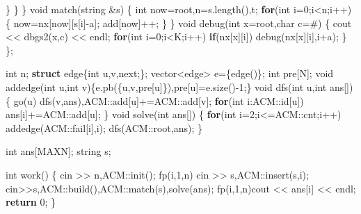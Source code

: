 \documentclass[
]{article}
\newenvironment{Shaded}{}{}
\newcommand{\CharTok}[1]{\textcolor[rgb]{0.25,0.44,0.63}{#1}}
\newcommand{\ControlFlowTok}[1]{\textcolor[rgb]{0.00,0.44,0.13}{\textbf{#1}}}
\newcommand{\DataTypeTok}[1]{\textcolor[rgb]{0.56,0.13,0.00}{#1}}
\newcommand{\DecValTok}[1]{\textcolor[rgb]{0.25,0.63,0.44}{#1}}
\newcommand{\KeywordTok}[1]{\textcolor[rgb]{0.00,0.44,0.13}{\textbf{#1}}}
\newcommand{\NormalTok}[1]{#1}
\begin{document}
\begin{Shaded}
\begin{Highlighting}[]
\NormalTok{            \}}
\NormalTok{        \}}
\NormalTok{    \}}
    \DataTypeTok{void}\NormalTok{ match(string \&s)}
\NormalTok{    \{}
        \DataTypeTok{int}\NormalTok{ now=root,n=s.length(),t;}
        \ControlFlowTok{for}\NormalTok{(}\DataTypeTok{int}\NormalTok{ i=}\DecValTok{0}\NormalTok{;i\textless{}n;i++)}
\NormalTok{        \{}
\NormalTok{            now=nx[now][s[i]{-}}\CharTok{\textquotesingle{}a\textquotesingle{}}\NormalTok{];}
\NormalTok{            add[now]++;}
\NormalTok{        \}}
\NormalTok{    \}}
    \DataTypeTok{void}\NormalTok{ debug(}\DataTypeTok{int}\NormalTok{ x=root,}\DataTypeTok{char}\NormalTok{ c=}\CharTok{\textquotesingle{}\#\textquotesingle{}}\NormalTok{)}
\NormalTok{    \{}
\NormalTok{        cout \textless{}\textless{} dbgs2(x,c) \textless{}\textless{} endl;}
        \ControlFlowTok{for}\NormalTok{(}\DataTypeTok{int}\NormalTok{ i=}\DecValTok{0}\NormalTok{;i\textless{}K;i++)}
            \ControlFlowTok{if}\NormalTok{(nx[x][i])}
\NormalTok{                debug(nx[x][i],i+}\CharTok{\textquotesingle{}a\textquotesingle{}}\NormalTok{);}
\NormalTok{    \}}
\NormalTok{\};}

\DataTypeTok{int}\NormalTok{ n;}
\KeywordTok{struct}\NormalTok{ edge\{}\DataTypeTok{int}\NormalTok{ u,v,next;\};}
\NormalTok{vector\textless{}edge\textgreater{} e=\{edge()\};}
\DataTypeTok{int}\NormalTok{ pre[N];}
\DataTypeTok{void}\NormalTok{ addedge(}\DataTypeTok{int}\NormalTok{ u,}\DataTypeTok{int}\NormalTok{ v)\{e.pb(\{u,v,pre[u]\}),pre[u]=e.size(){-}}\DecValTok{1}\NormalTok{;\}}
\DataTypeTok{void}\NormalTok{ dfs(}\DataTypeTok{int}\NormalTok{ u,}\DataTypeTok{int}\NormalTok{ ans[])}
\NormalTok{\{}
\NormalTok{    go(u) dfs(v,ans),ACM::add[u]+=ACM::add[v];}
    \ControlFlowTok{for}\NormalTok{(}\DataTypeTok{int}\NormalTok{ i:ACM::id[u])}
\NormalTok{        ans[i]+=ACM::add[u];}
\NormalTok{\}}
\DataTypeTok{void}\NormalTok{ solve(}\DataTypeTok{int}\NormalTok{ ans[])}
\NormalTok{\{}
    \ControlFlowTok{for}\NormalTok{(}\DataTypeTok{int}\NormalTok{ i=}\DecValTok{2}\NormalTok{;i\textless{}=ACM::cnt;i++)}
\NormalTok{        addedge(ACM::fail[i],i);}
\NormalTok{    dfs(ACM::root,ans);}
\NormalTok{\}}

\DataTypeTok{int}\NormalTok{ ans[MAXN];}
\NormalTok{string s;}

\DataTypeTok{int}\NormalTok{ work()}
\NormalTok{\{}
\NormalTok{    cin \textgreater{}\textgreater{} n,ACM::init();}
\NormalTok{    fp(i,}\DecValTok{1}\NormalTok{,n) cin \textgreater{}\textgreater{} s,ACM::insert(s,i);}
\NormalTok{    cin\textgreater{}\textgreater{}s,ACM::build(),ACM::match(s),solve(ans);}
\NormalTok{    fp(i,}\DecValTok{1}\NormalTok{,n)cout \textless{}\textless{} ans[i] \textless{}\textless{} endl;}
    \ControlFlowTok{return} \DecValTok{0}\NormalTok{;}
\NormalTok{\}}
\end{Highlighting}
\end{Shaded}
\end{document}
